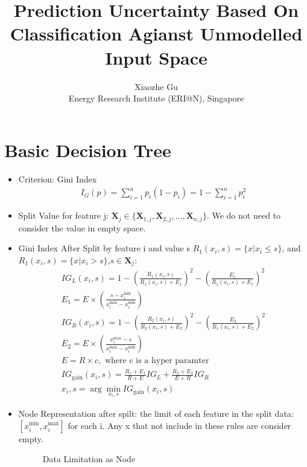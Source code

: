 \documentclass[11pt,onecolumn]{IEEEtran}
\begin{document}
     
\title{Prediction Uncertainty Based On Classification Agianst Unmodelled Input Space}
\author{Xiaozhe Gu\\Energy Research Institute (ERI@N), Singapore }

\maketitle

\section{Basic Decision Tree}
\begin{itemize}
  \item Criterion: Gini Index
\begin{align*}
I_G(p)=\sum_{i=1}^np_i(1-p_i)=1-\sum_{i=1}^n p_i^2
\end{align*}
\item Split Value for feature j: $\mathbf X_j\in  \{\mathbf X_{1,j},\mathbf X_{2,j},\ldots,\mathbf X_{n,j}\}$. We do not need to consider the value in empty space.
\item Gini Index After Split by feature i and value s $R_1(x_i,s)=\{x|x_i\leq s\}$, and $R_1(x_i,s)=\{x|x_i>s\}$,$s \in \mathbf X_j$:
\begin{align*}
IG_L(x_i,s)=1-\left(\frac{R_1(x_i,s)}{R_1(x_i,s)+E_1}\right)^2-\left(\frac{E_1}{R_1(x_i,s)+E_1}\right)^2\\
E_1=E\times \left(\frac{s-x_i^{\mbox{min}}}{x_i^{\mbox{max}}-x_i^{\mbox{min}}}\right)\\
IG_R(x_i,s)=1-\left(\frac{R_2(x_i,s)}{R_2(x_i,s)+E_2}\right)^2-\left(\frac{E_2}{R_1(x_i,s)+E_2}\right)^2\\
E_2=E\times \left(\frac{x_i^{\mbox{max}}-s}{x_i^{\mbox{max}}-x_i^{\mbox{min}}}\right)\\
E=R\times c,\mbox{ where c is a hyper paramter}\\ 
IG_{\mbox{gain}}(x_i,s)=\frac{R_1+E_1}{R+E}IG_L+\frac{R_2+E_2}{E+R}IG_R\\
x_i,s=\arg \min_{x_i,s} IG_{\mbox{gain}}(x_i,s)
\end{align*}
\item Node Representation after spilt: the limit of each feature in the split data:  $[x_i^{\mbox{min}},x_i^{\mbox{max}}]$ for each i.  Any x that not include in these rules are consider empty. 
  \begin{figure}[h]
    \centering
    \caption{Data Limitation as Node}

\end{figure}
\end{itemize}
\end{document}
